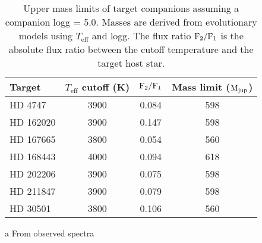 \begin{table}
        \centering
        \caption{Upper mass limits of target companions assuming a companion logg = 5.0. Masses are derived from \citet{baraffe_new_2015} evolutionary models using  \(T_{\textrm{eff}}\) and logg. The flux ratio \(\rm F_2/F_1\) is the absolute flux ratio between the cutoff temperature and the target host star.}
        \begin{tabular}{l c c c}
            \toprule
            Target & \(T_{\textrm{eff}}\) cutoff (K) & \(\rm F_2/F_1\) & Mass limit ($\rm M_{jup}$)\\
            \midrule
            {HD 4747}     &  3900 & 0.084 & 598\\ 
            {HD 162020} & 3900 & 0.147 & 598\\
            {HD 167665} & 3800 & 0.054 & 560\\
            {HD 168443} & 4000 & 0.094 & 618\\
            {HD 202206} & 3900 & 0.075 & 598\\
            {HD 211847} & 3900 & 0.079 & 598 \\
            {HD 30501}   & 3800\tnote{a} & 0.106 & 560\\
            \bottomrule
        \end{tabular}
        \begin{tablenotes}
                \item [a] {From observed spectra}
        \end{tablenotes}
    \label{tab:mass_limits}
\end{table}

